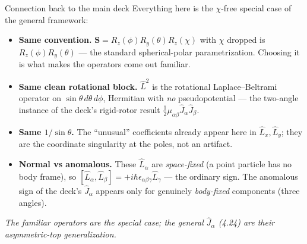 \documentclass[aspectratio=169,10pt]{beamer}
\begin{document}
\begin{frame}{Connection back to the main deck}
\small
Everything here is the $\chi$-free special case of the general framework:
\begin{itemize}\setlength{\itemsep}{3pt}
\item \textbf{Same convention.} $\mathbf S=R_z(\phi)R_y(\theta)R_z(\chi)$ with $\chi$ dropped is $R_z(\phi)R_y(\theta)$ --- the standard spherical-polar parametrization. Choosing it is what makes the operators come out familiar.
\item \textbf{Same clean rotational block.} $\hat L^2$ is the rotational Laplace--Beltrami operator on $\sin\theta\,d\theta\,d\phi$, Hermitian with \emph{no} pseudopotential --- the two-angle instance of the deck's rigid-rotor result $\tfrac12\mu_{\alpha\beta}\hat J_\alpha\hat J_\beta$.
\item \textbf{Same $1/\sin\theta$.} The ``unusual'' coefficients already appear here in $\hat L_x,\hat L_y$; they are the coordinate singularity at the poles, not an artifact.
\item \textbf{Normal vs anomalous.} These $\hat L_\alpha$ are \emph{space-fixed} (a point particle has no body frame), so $[\hat L_\alpha,\hat L_\beta]=+i\hbar\epsilon_{\alpha\beta\gamma}\hat L_\gamma$ --- the ordinary sign. The anomalous sign of the deck's $\hat J_\alpha$ appears only for genuinely \emph{body-fixed} components (three angles).
\end{itemize}
\centering\itshape The familiar operators are the special case; the general $\hat J_\alpha$ (4.24) are their asymmetric-top generalization.
\end{frame}
\end{document}
